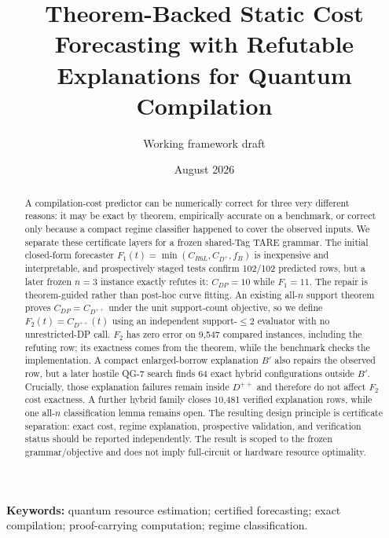\documentclass[11pt]{article}
\title{Theorem-Backed Static Cost Forecasting with Refutable Explanations for Quantum Compilation}
\author{Working framework draft}
\date{August 2026}
\begin{document}
\maketitle
\begin{abstract}
A compilation-cost predictor can be numerically correct for three very different reasons: it may be exact by theorem, empirically accurate on a benchmark, or correct only because a compact regime classifier happened to cover the observed inputs. We separate these certificate layers for a frozen shared-Tag TARE grammar. The initial closed-form forecaster $F_1(t)=\min(C_{R6L},C_{D^+},f_B)$ is inexpensive and interpretable, and prospectively staged tests confirm 102/102 predicted rows, but a later frozen $n=3$ instance exactly refutes it: $C_{DP}=10$ while $F_1=11$. The repair is theorem-guided rather than post-hoc curve fitting. An existing all-$n$ support theorem proves $C_{DP}=C_{D^{++}}$ under the unit support-count objective, so we define $F_2(t)=C_{D^{++}}(t)$ using an independent support-$\le2$ evaluator with no unrestricted-DP call. $F_2$ has zero error on 9,547 compared instances, including the refuting row; its exactness comes from the theorem, while the benchmark checks the implementation. A compact enlarged-borrow explanation $B'$ also repairs the observed row, but a later hostile QG-7 search finds 64 exact hybrid configurations outside $B'$. Crucially, those explanation failures remain inside $D^{++}$ and therefore do not affect $F_2$ cost exactness. A further hybrid family closes 10,481 verified explanation rows, while one all-$n$ classification lemma remains open. The resulting design principle is certificate separation: exact cost, regime explanation, prospective validation, and verification status should be reported independently. The result is scoped to the frozen grammar/objective and does not imply full-circuit or hardware resource optimality.
\end{abstract}

\noindent\textbf{Keywords:} quantum resource estimation; certified forecasting; exact compilation; proof-carrying computation; regime classification.













\end{document}
